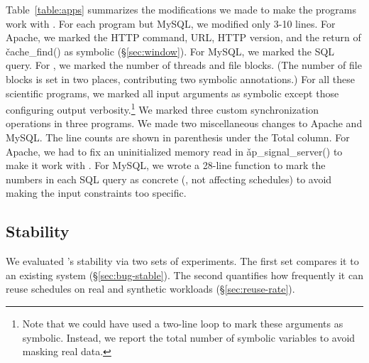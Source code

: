 Table~\ref{table:apps} summarizes the modifications we made to make the
programs work with \tern.  For each program but MySQL, we modified only 3-10
lines.  For Apache, we marked the HTTP command, URL, HTTP version, and the
return of \v{cache\_find()} as symbolic (\S\ref{sec:window}).  For MySQL,
we marked the SQL query.  For \pbzip, we marked the number of threads and
file blocks.  (The number of file blocks is set in two places,
contributing two symbolic annotations.)  For all these scientific programs, we
marked all input arguments as symbolic except those configuring output
verbosity.\footnote{Note that we could have used a two-line loop to mark
  these arguments as symbolic.  Instead, we report the total number of
  symbolic variables to avoid masking real data.}  We marked three custom
synchronization operations in three \splash programs.  We made two
miscellaneous changes to Apache and MySQL.  The line counts are shown in
parenthesis under the Total column.  For Apache, we had to fix an
uninitialized memory read in \v{ap\_signal\_server()} to make it work with
\klee.  For MySQL, we wrote a 28-line function to mark the numbers in each
SQL query as concrete (\ie, not affecting schedules) to avoid making the
input constraints too specific.



\subsection{Stability} \label{sec:tern-stability}

We evaluated \tern's stability via two sets of experiments.  The first set
compares it to an existing \dmt system (\S\ref{sec:bug-stable}). The
second quantifies how frequently it can reuse schedules on real and
synthetic workloads (\S\ref{sec:reuse-rate}).

